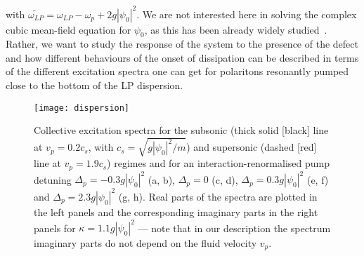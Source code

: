 %
with $\widetilde{\omega_{LP}} = \omega_{LP}-\omega_p + 2g
|\psi_0|^2$. We are not interested here in solving the complex cubic
mean-field equation for $\psi_0$, as this has been already widely
studied~\cite{9780199228942}. Rather, we want to study the response
of the system to the presence of the defect and how different
behaviours of the onset of dissipation can be described in terms of
the different excitation spectra one can get for polaritons resonantly
pumped close to the bottom of the LP dispersion.

\begin{figure}[tb]\centering
\texttt{[image: dispersion]} %
\caption{
%
Collective excitation spectra for the subsonic (thick
solid [black] line at $v_p=0.2 c_s$, with $c_s=\sqrt{g|\psi_0|^2/m}$)
and supersonic (dashed [red] line at $v_p=1.9 c_s$) regimes and for an
interaction-renormalised pump detuning $\Delta_p=-0.3 g|\psi_0|^2$ (a,
b), $\Delta_p = 0$ (c, d), $\Delta_p=0.3g|\psi_0|^2$ (e, f) and
$\Delta_p=2.3g|\psi_0|^2$ (g, h). Real parts of the spectra are
plotted in the left panels and the corresponding imaginary parts in
the right panels for $\kappa=1.1 g|\psi_0|^2$ --- note that in our
description the spectrum imaginary parts do not depend on the fluid
velocity $v_p$.
%
}\label{fig:spect_pmp_only}
\end{figure}
%


